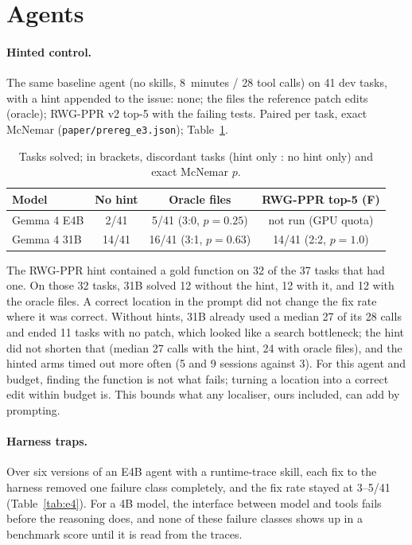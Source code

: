 \documentclass[10pt]{article}
\newcommand{\code}[1]{\texttt{#1}}
\begin{document}
\section{Agents}

\paragraph{Hinted control.} The same baseline agent (no skills, 8~minutes / 28 tool calls) on 41 dev tasks, with a hint
appended to the issue: none; the files the reference patch edits (oracle); RWG-PPR v2 top-5 with the failing tests.
Paired per task, exact McNemar (\code{paper/prereg\_e3.json}); Table~\ref{tab:e3}.

\begin{table}[h]
\centering\small
\begin{tabular}{lccc}
\toprule
Model & No hint & Oracle files & RWG-PPR top-5 (F) \\
\midrule
Gemma 4 E4B & 2/41 & 5/41 (3:0, $p=0.25$) & not run (GPU quota) \\
Gemma 4 31B & 14/41 & 16/41 (3:1, $p=0.63$) & 14/41 (2:2, $p=1.0$) \\
\bottomrule
\end{tabular}
\caption{Tasks solved; in brackets, discordant tasks (hint only : no hint only) and exact McNemar $p$.}
\label{tab:e3}
\end{table}

The RWG-PPR hint contained a gold function on 32 of the 37 tasks that had one. On those 32 tasks, 31B solved 12 without
the hint, 12 with it, and 12 with the oracle files. A correct location in the prompt did not change the fix rate where
it was correct. Without hints, 31B already used a median 27 of its 28 calls and ended 11 tasks with no patch, which
looked like a search bottleneck; the hint did not shorten that (median 27 calls with the hint, 24 with oracle files), and
the hinted arms timed out more often (5 and 9 sessions against 3). For this agent and budget, finding the function is
not what fails; turning a location into a correct edit within budget is. This bounds what any localiser, ours included,
can add by prompting.

\paragraph{Harness traps.} Over six versions of an E4B agent with a runtime-trace skill, each fix to the harness removed
one failure class completely, and the fix rate stayed at 3--5/41 (Table~\ref{tab:e4}). For a 4B model, the interface
between model and tools fails before the reasoning does, and none of these failure classes shows up in a benchmark
score until it is read from the traces.
\end{document}

